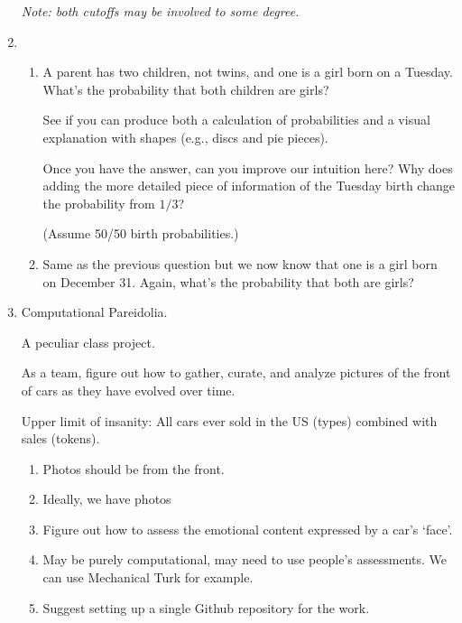 \begin{enumerate}
  \textit{Note: both cutoffs may be involved to some degree.}

  
   \solutionstart


   \solutionend

\item
  \begin{enumerate}
  \item 
    A parent has two children, not twins, and one is a girl born on a Tuesday.
    What's the probability that both children are girls?

    See if you can produce both a calculation of probabilities and
    a visual explanation with shapes (e.g., discs and pie pieces).

    Once you have the answer, can you improve our intuition here?  
    Why does adding the more
    detailed piece of information of the Tuesday birth change
    the probability from $1/3$?

    (Assume 50/50 birth probabilities.)
  \item 
    Same as the previous question but we now know that one is
    a girl born on December 31.  Again, what's the probability that
    both are girls?
  \end{enumerate}

  
   \solutionstart


   \solutionend


\item
  Computational Pareidolia.

  A peculiar class project.

  As a team, figure out how to gather, curate, and analyze
  pictures of the front of cars as they have evolved over time.

  Upper limit of insanity: All cars ever sold in the US (types)
  combined with sales (tokens).

  \begin{enumerate}
  \item
    Photos should be from the front.
  \item
    Ideally, we have photos 
  \item
    Figure out how to assess the emotional content expressed by
    a car's `face'.
  \item
    May be purely computational, may need to use people's assessments.
    We can use Mechanical Turk for example.
  \item
    Suggest setting up a single Github repository for the work.


\end{enumerate}
\end{enumerate}
